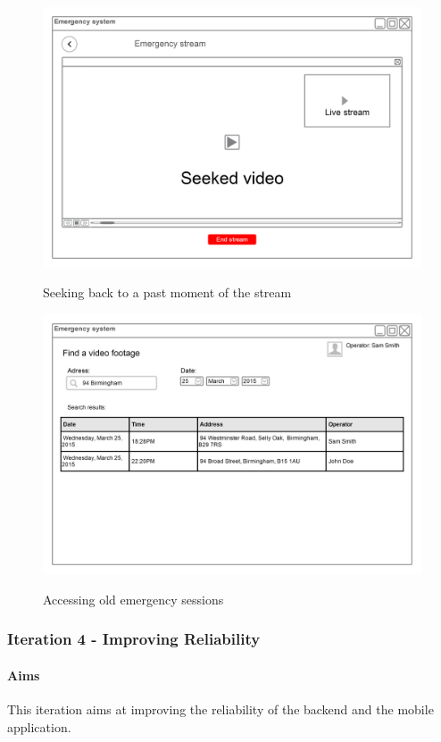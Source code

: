 \documentclass{article}
\begin{document}
	\begin{figure}[H]
		\centering
		\includegraphics[width=.9\textwidth]{"EmergencyAppIteration3/backend_videocall_nochat (1)"}
		
		Seeking back to a past moment of the stream
	\end{figure}
	\begin{figure}[H]
		\centering
		\includegraphics[width=.9\textwidth]{"EmergencyAppIteration3/backend_find_video_footage (1)"}
		
		Accessing old emergency sessions
	\end{figure}
			
	\pagebreak
	\subsubsection{Iteration 4 - Improving Reliability}
			\paragraph{Aims}
			This iteration aims at improving the reliability of the backend and the mobile application.
\end{document}
